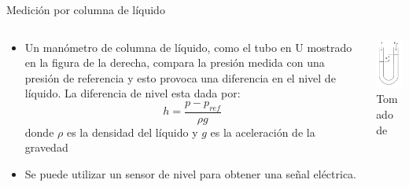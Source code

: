 \documentclass[aspectratio=169]{beamer}
\begin{document}
\begin{frame}{Medición por columna de líquido}
    \begin{columns}[c, onlytextwidth]
        \begin{column}{0.8\textwidth}
            \begin{itemize}
                \item Un manómetro de columna de líquido, como el tubo en U mostrado en la figura de la derecha, compara la presión medida con una presión de referencia y esto provoca una diferencia en el nivel de líquido. La diferencia de nivel esta dada por:
                \begin{equation*}
                    h = \dfrac{p-p_{ref}}{\rho g}
                \end{equation*}
                donde $\rho$ es la densidad del líquido y $g$ es la aceleración de la gravedad
                \item Se puede utilizar un sensor de nivel para obtener una señal eléctrica. 
            \end{itemize}
        \end{column}
        \begin{column}{0.2\textwidth}
            \centering
            \includegraphics[width=3cm]{fig/Presion/columna.PNG}
             \\ \tiny{Tomado de \cite{pallas2012sensors}}
        \end{column}
    \end{columns}
\end{frame}
\end{document}
